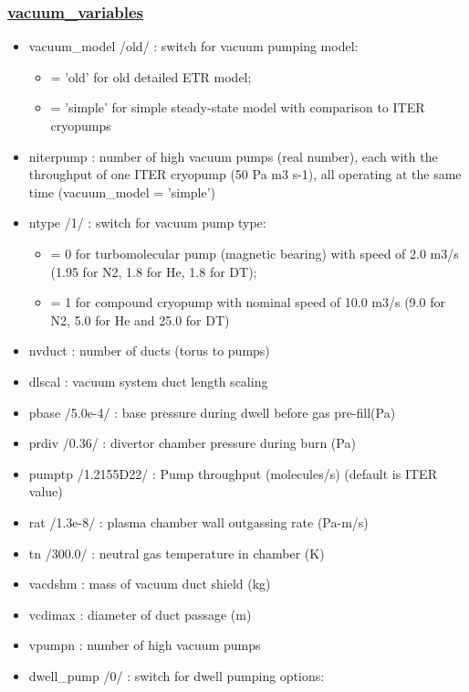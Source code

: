 \documentclass[
]{article}
\providecommand{\tightlist}{%
  \setlength{\itemsep}{0pt}\setlength{\parskip}{0pt}}
\begin{document}
\begin{itemize}
  \hypertarget{vacuum_variables}{%
  \subsubsection{\texorpdfstring{\href{vacuum_variables.html}{vacuum\_variables}}{vacuum\_variables}}\label{vacuum_variables}}

  \begin{itemize}
  \item
    vacuum\_model /old/ : switch for vacuum pumping model:

    \begin{itemize}
    \tightlist
    \item
      = 'old' for old detailed ETR model;
    \item
      = 'simple' for simple steady-state model with comparison to ITER
      cryopumps
    \end{itemize}
  \item
    niterpump : number of high vacuum pumps (real number), each with the
    throughput of one ITER cryopump (50 Pa m3 s-1), all operating at the
    same time (vacuum\_model = 'simple')
  \item
    ntype /1/ : switch for vacuum pump type:

    \begin{itemize}
    \tightlist
    \item
      = 0 for turbomolecular pump (magnetic bearing) with speed of 2.0
      m3/s (1.95 for N2, 1.8 for He, 1.8 for DT);
    \item
      = 1 for compound cryopump with nominal speed of 10.0 m3/s (9.0 for
      N2, 5.0 for He and 25.0 for DT)
    \end{itemize}
  \item
    nvduct : number of ducts (torus to pumps)
  \item
    dlscal : vacuum system duct length scaling
  \item
    pbase /5.0e-4/ : base pressure during dwell before gas pre-fill(Pa)
  \item
    prdiv /0.36/ : divertor chamber pressure during burn (Pa)
  \item
    pumptp /1.2155D22/ : Pump throughput (molecules/s) (default is ITER
    value)
  \item
    rat /1.3e-8/ : plasma chamber wall outgassing rate (Pa-m/s)
  \item
    tn /300.0/ : neutral gas temperature in chamber (K)
  \item
    vacdshm : mass of vacuum duct shield (kg)
  \item
    vcdimax : diameter of duct passage (m)
  \item
    vpumpn : number of high vacuum pumps
  \item
    dwell\_pump /0/ : switch for dwell pumping options:


\end{itemize}
\end{itemize}
\end{document}
